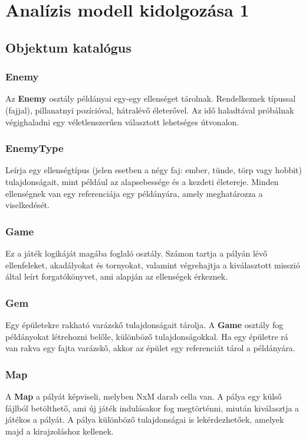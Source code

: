 %
\chapter{Analízis modell kidolgozása 1}

\thispagestyle{fancy}

\section{Objektum katalógus}

\subsection{Enemy}
Az \textbf{Enemy} osztály példányai egy-egy ellenséget tárolnak. Rendelkeznek típussal (fajjal), pillanatnyi pozícióval, hátralévő életerővel. Az idő haladtával próbálnak végighaladni egy véletlenszerűen választott lehetséges útvonalon.

\subsection{EnemyType}
Leírja egy ellenségtípus (jelen esetben a négy faj: ember, tünde, törp vagy hobbit) tulajdonságait, mint például az alapsebessége és a kezdeti életereje. Minden ellenségnek van egy referenciája egy példányára, amely meghatározza a viselkedését.

\subsection{Game}
Ez a játék logikáját magába foglaló osztály. Számon tartja a pályán lévő ellenfeleket, akadályokat és tornyokat, valamint végrehajtja a kiválasztott misszió által leírt forgatókönyvet, ami alapján az ellenségek érkeznek.

\subsection{Gem}
Egy épületekre rakható varázskő tulajdonságait tárolja. A \textbf{Game} osztály fog példányokat létrehozni belőle, különböző tulajdonságokkal. Ha egy épületre rá van rakva egy fajta varázskő, akkor az épület egy referenciát tárol a példányára.

\subsection{Map}
A \textbf{Map} a pályát képviseli, melyben NxM darab cella van. A pálya egy külső fájlból betölthető, ami új játék indulásakor fog megtörténni, miután kiválasztja a játékos a pályát. A pálya különböző tulajdonságai is lekérdezhetőek, amelyek majd a kirajzoláshoz kellenek.

